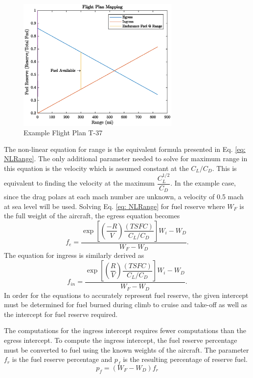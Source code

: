 \begin{figure} 
    \centering
    \includegraphics[width = 8cm]{Thesis/Method/ExampleFlightT37.eps}
    \caption{Example Flight Plan T-37}
    \label{fig:exT37}
\end{figure}
The non-linear equation for range is the equivalent formula presented in Eq. \ref{eq: NLRange}. The only additional parameter needed to solve for maximum range in this equation is the velocity which is assumed constant at the $C_L/C_D$. This is equivalent to finding the velocity at the maximum $\dfrac{C_L^{1/2}}{C_D}$. In the example case, since the drag polars at each mach number are unknown, a velocity of 0.5 mach at sea level will be used. Solving Eq. \ref{eq: NLRange} for fuel reserve where $W_F$ is the full weight of the aircraft, the egress equation becomes
\begin{equation}
    f_e = \dfrac{\exp\left[\left(\dfrac{-R}{V}\right)\dfrac{(TSFC)}{C_L/C_D}\right]W_i-W_D}{W_F - W_D}.
    \label{eq: NLEgressEq}
\end{equation}
The equation for ingress is similarly derived as 
\begin{equation}
    f_{in} =\dfrac{\exp\left[\left(\dfrac{R}{V}\right)\dfrac{(TSFC)}{C_L/C_D}\right]W_i-W_D}{W_F - W_D}.
    \label{eq: NLIngressEq}
\end{equation}
In order for the equations to accurately represent fuel reserve, the given intercept must be determined for fuel burned during climb to cruise and take-off as well as the intercept for fuel reserve required.\par
The computations for the ingress intercept requires fewer computations than the egress intercept. To compute the ingress intercept, the fuel reserve percentage must be converted to fuel using the known weights of the aircraft. The parameter $f_r$ is the fuel reserve percentage and $p_f$ is the resulting percentage of reserve fuel.
\begin{equation*}
    p_f = (W_F - W_D)f_r
\end{equation*}
